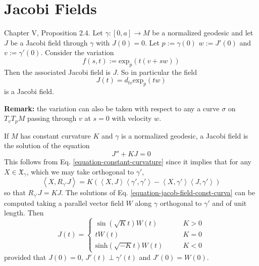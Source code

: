 \documentclass{book}
\begin{document}
\section{Jacobi Fields}
\label{section-jacobi-fields}

\begin{proposition}
\label{proposition-everyday-jacobi-field}
\cite{doc} Chapter V, Proposition 2.4. Let
$\gamma:[0,a]\to M$ be a normalized
geodesic and let $J$ be a Jacobi field
through $\gamma$ with $J(0)=0$.
Let $p:=\gamma(0)$ $w:=J'(0)$ and
$v:=\gamma'(0)$.
Consider the variation
$$
f(s,t):=\text{exp}_{p}(t(v+sw))
$$
Then the associated Jacobi field is $J$. So
in particular the field
$$
J(t)=d_{tv}\text{exp}_p(tw)
$$
is a Jacobi field.

{\bf Remark:} the variation can also be taken
with respect to
any a curve $\sigma$ on $T_vT_{p}M$ passing
through $v$
at $s=0$ with velocity $w$.
\end{proposition}

\begin{example}
\label{example-jacob-field-const-curva}
If $M$ has constant curvature $K$ and
$\gamma$ is a normalized geodesic, a
Jacobi field is the solution of the equation
\begin{equation}
\label{equation-jacob-field-const-curva}
J''+KJ=0
\end{equation}
This follows from Eq.
\ref{equation-constant-curvature} since it
implies that
for any $X\in\mathfrak{X}_\gamma$, which we
may take orthogonal to $\gamma'$,
$$
\left\langle{}X,R_{\gamma'}J\right\rangle{}
=K(\left\langle{}X,J\right\rangle{}\left\langle{}\gamma',
\gamma'\right\rangle{}
-\left\langle{}X,\gamma'\right\rangle{}\left\langle{}J,
\gamma'\right\rangle{})
$$
so that $R_{\gamma'}J=KJ$. The solutions of
Eq.
\ref{equation-jacob-field-const-curva} can be
computed taking a
parallel vector field $W$ along $\gamma$
orthogonal to $\gamma'$ and of unit
length. Then
\begin{equation}
\label{equation-jacob-field-const-curva-2}
J(t)=\begin{cases}
\sin(\sqrt{K}t)W(t)\qquad & K>0\\
tW(t)\qquad &K=0\\
\text{sinh}(\sqrt{-K}t)W(t)\qquad &K<0
\end{cases}
\end{equation}
provided that $J(0)=0$, $J'(t)\perp
\gamma'(t)$ and $J'(0)=W(0)$.
\end{example}
\end{document}
